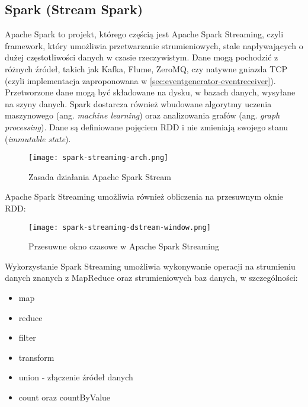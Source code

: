 \subsection{Spark (Stream Spark)}
\label{sec:solutions:spark}

Apache Spark to projekt, którego częścią jest Apache Spark Streaming, czyli framework, który umożliwia przetwarzanie strumieniowych, stale napływających o dużej częstotliwości danych w czasie rzeczywistym. Dane mogą pochodzić z różnych źródeł, takich jak Kafka, Flume, ZeroMQ, czy natywne gniazda TCP (czyli implementacja zaproponowana w \ref{sec:eventgenerator-eventreceiver}). Przetworzone dane mogą być składowane na dysku, w bazach danych, wysyłane na szyny danych. Spark dostarcza również wbudowane algorytmy uczenia maszynowego (ang. \emph{machine learning}) oraz analizowania grafów (ang. \emph{graph processing}). Dane są definiowane pojęciem RDD\cite{manual-apache-spark-streaming} i nie zmieniają swojego stanu (\emph{immutable state}).

\begin{figure}[h!]
  \centering
    \texttt{[image: spark-streaming-arch.png]}
  \caption{Zasada działania Apache Spark Stream}
  \label{fig:spark-streaming-arch}
\end{figure}

Apache Spark Streaming umożliwia również obliczenia na przesuwnym oknie RDD:

\begin{figure}[h!]
  \centering
    \texttt{[image: spark-streaming-dstream-window.png]}
  \caption{Przesuwne okno czasowe w Apache Spark Streaming}
  \label{fig:spark-streaming-dstream-window}
\end{figure}

Wykorzystanie Spark Streaming umożliwia wykonywanie operacji na strumieniu danych znanych z MapReduce oraz strumieniowych baz danych, w szczególności:

\begin{itemize}[noitemsep]
  \item map
  \item reduce
  \item filter
  \item transform
  \item union - złączenie źródeł danych
  \item count oraz countByValue
\end{itemize}
